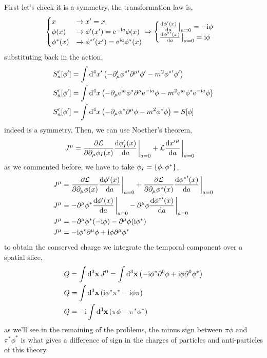 First let's check it is a symmetry, the transformation law is,
\begin{align}
    \begin{cases}
        x&\rightarrow x' = x\\
        \phi(x)&\rightarrow \phi'\qty(x') = \e^{-\im a}\phi\qty(x)\\
        \phi^\ast(x)&\rightarrow {\phi^\ast}'\qty(x') = \e^{\im a}\phi^\ast\qty(x)
    \end{cases}\Rightarrow \begin{cases}
        \dv{\phi'(x)}{a}\eval_{a=0} = -\im\phi\\
        \dv{{\phi^\ast}'(x)}{a}\eval_{a=0} = \im\phi
    \end{cases}
\end{align}
substituting back in the action,
\begin{align}
    S_a'[\phi']&=\int\dd[4]{x'}\qty(-\partial_\mu '{\phi^\ast}'{\partial^\mu}'\phi'-m^2{\phi^\ast}'\phi')\\
    S_a'[\phi']&=\int\dd[4]{x}\qty(-\partial_\mu \textnormal{e}^{\textnormal{i} a}{\phi^\ast}{\partial^\mu}\textnormal{e}^{-\textnormal{i} a}\phi-m^2\textnormal{e}^{\textnormal{i} a}{\phi^\ast}\textnormal{e}^{-\textnormal{i} a}\phi)\\
    S_a'[\phi']&=\int\dd[4]{x}\qty(-\partial_\mu{\phi^\ast}{\partial^\mu}\phi-m^2{\phi^\ast}\phi) = S[\phi]
\end{align}
indeed is a symmetry. Then, we can use Noether's theorem,
\begin{align}
    \tensor{J}{^\mu} &=\pdv{\mathcal L}{\partial_\mu\phi_ I\qty(x)}\dv{\phi_ I'\qty(x)}{a}\eval_{a=0}+\mathcal L\dv{{x'}^\mu}{a}\eval_{a=0}
\end{align}
as we commented before, we have to take $\phi_I=\qty{\phi,\phi^\ast}$,
\begin{align}    
    \tensor{J}{^\mu} &=\pdv{\mathcal L}{\partial_\mu\phi\qty(x)}\dv{\phi'\qty(x)}{a}\eval_{a=0}+\pdv{\mathcal L}{\partial_\mu\phi^\ast\qty(x)}\dv{{\phi^\ast}'\qty(x)}{a}\eval_{a=0}\\
    \tensor{J}{^\mu} &=-\partial^\mu\phi^\ast\dv{\phi'\qty(x)}{a}\eval_{a=0}-\partial^\mu\phi\dv{{\phi^\ast}'\qty(x)}{a}\eval_{a=0}\\
    \tensor{J}{^\mu} &=-\partial^\mu\phi^\ast\qty(-\im\phi)-\partial^\mu\phi\qty(\im \phi^\ast)\\
    \tensor{J}{^\mu} &=-\im \phi^\ast\partial^\mu\phi+\im\phi\partial^\mu\phi^\ast
\end{align}
to obtain the conserved charge we integrate the temporal component over a spatial slice,
\begin{align}
    Q&= \int\dd[3]{\vb x}J^0=\int\dd[3]{\vb x}\qty(-\textnormal{i} \phi^\ast\partial^0\phi+\textnormal{i}\phi\partial^0\phi^\ast)\\
    Q&=\int\dd[3]{\vb x}\qty(\textnormal{i} \phi^\ast\pi^\ast-\textnormal{i}\phi\pi)\\
    Q&=-\textnormal{i}\int\dd[3]{\vb x}\qty(\pi\phi-\pi^\ast \phi^\ast)
\end{align}
as we'll see in the remaining of the problems, the minus sign between $\pi\phi$ and $\pi^\ast\phi^\ast$ is 
what gives a difference of sign in the charges of particles and anti-particles of 
this theory.


